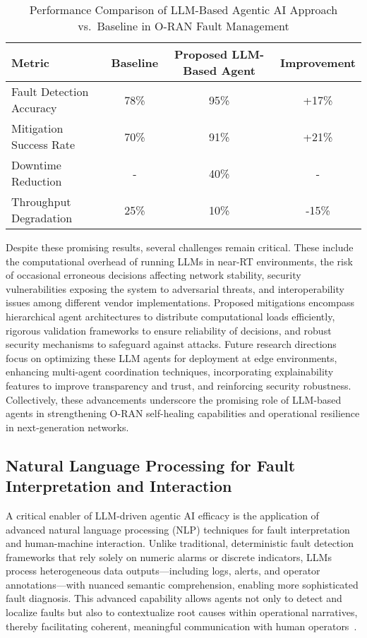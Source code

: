\documentclass[sigconf]{acmart}
\begin{document}
\begin{table*}[htbp]
\centering
\caption{Performance Comparison of LLM-Based Agentic AI Approach vs.\ Baseline in O-RAN Fault Management}
\label{tab:LLMAgentPerformance}
\begin{adjustbox}{max width=\textwidth}
\begin{tabular}{@{}lccc@{}}
\toprule
Metric & Baseline & Proposed LLM-Based Agent & Improvement \\
\midrule
Fault Detection Accuracy & 78\% & 95\% & +17\% \\
Mitigation Success Rate & 70\% & 91\% & +21\% \\
Downtime Reduction & - & 40\% & - \\
Throughput Degradation & 25\% & 10\% & -15\% \\
\bottomrule
\end{tabular}
\end{adjustbox}
\end{table*}

Despite these promising results, several challenges remain critical. These include the computational overhead of running LLMs in near-RT environments, the risk of occasional erroneous decisions affecting network stability, security vulnerabilities exposing the system to adversarial threats, and interoperability issues among different vendor implementations. Proposed mitigations encompass hierarchical agent architectures to distribute computational loads efficiently, rigorous validation frameworks to ensure reliability of decisions, and robust security mechanisms to safeguard against attacks. Future research directions focus on optimizing these LLM agents for deployment at edge environments, enhancing multi-agent coordination techniques, incorporating explainability features to improve transparency and trust, and reinforcing security robustness. Collectively, these advancements underscore the promising role of LLM-based agents in strengthening O-RAN self-healing capabilities and operational resilience in next-generation networks.

\subsection{Natural Language Processing for Fault Interpretation and Interaction}

A critical enabler of LLM-driven agentic AI efficacy is the application of advanced natural language processing (NLP) techniques for fault interpretation and human-machine interaction. Unlike traditional, deterministic fault detection frameworks that rely solely on numeric alarms or discrete indicators, LLMs process heterogeneous data outputs—including logs, alerts, and operator annotations—with nuanced semantic comprehension, enabling more sophisticated fault diagnosis. This advanced capability allows agents not only to detect and localize faults but also to contextualize root causes within operational narratives, thereby facilitating coherent, meaningful communication with human operators~\cite{ref55}. 
\end{document}
